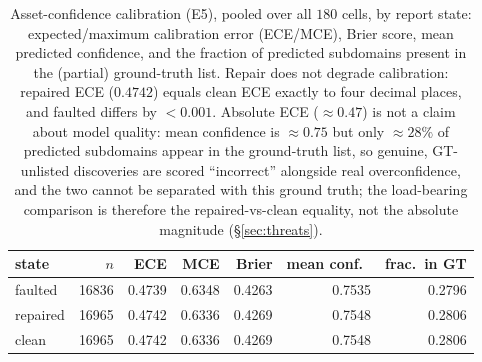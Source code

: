 \begin{table}[t]\centering\small
\caption{Asset-confidence calibration (E5), pooled over all $180$ cells, by report state: expected/maximum calibration error (ECE/MCE), Brier score, mean predicted confidence, and the fraction of predicted subdomains present in the (partial) ground-truth list. Repair does not degrade calibration: repaired ECE ($0.4742$) equals clean ECE exactly to four decimal places, and faulted differs by $<0.001$. Absolute ECE ($\approx0.47$) is not a claim about model quality: mean confidence is $\approx0.75$ but only $\approx28\%$ of predicted subdomains appear in the ground-truth list, so genuine, GT-unlisted discoveries are scored ``incorrect'' alongside real overconfidence, and the two cannot be separated with this ground truth; the load-bearing comparison is therefore the repaired-vs-clean equality, not the absolute magnitude (\S\ref{sec:threats}).}
\label{tab:e5-calibration}
\begin{tabular}{lrrrrrr}\toprule
state & $n$ & ECE & MCE & Brier & mean conf.\ & frac.\ in GT\\\midrule
faulted & 16836 & 0.4739 & 0.6348 & 0.4263 & 0.7535 & 0.2796\\
repaired & 16965 & 0.4742 & 0.6336 & 0.4269 & 0.7548 & 0.2806\\
clean & 16965 & 0.4742 & 0.6336 & 0.4269 & 0.7548 & 0.2806\\
\bottomrule\end{tabular}\end{table}
